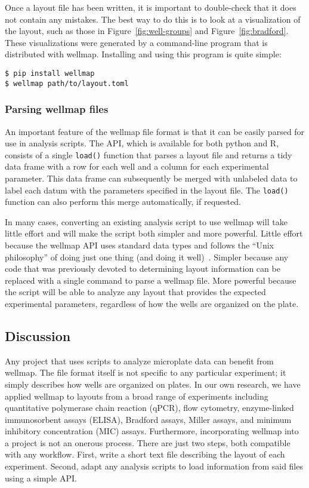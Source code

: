 \documentclass{bmcart}
\begin{document}
Once a layout file has been written, it is important to double-check that it does not contain any mistakes. The best way to do this is to look at a visualization of the layout, such as those in Figure~\ref{fig:well-groups} and Figure~\ref{fig:bradford}. These visualizations were generated by a command-line program that is distributed with wellmap. Installing and using this program is quite simple:

\begin{lstlisting}
$ pip install wellmap
$ wellmap path/to/layout.toml
\end{lstlisting}

\subsubsection*{Parsing wellmap files}

An important feature of the wellmap file format is that it can be easily parsed for use in analysis scripts. The API, which is available for both python and R, consists of a single \texttt{load()} function that parses a layout file and returns a tidy~\cite{wickham2014} data frame with a row for each well and a column for each experimental parameter. This data frame can subsequently be merged with unlabeled data to label each datum with the parameters specified in the layout file. The \texttt{load()} function can also perform this merge automatically, if requested.

In many cases, converting an existing analysis script to use wellmap will take little effort and will make the script both simpler and more powerful. Little effort because the wellmap API uses standard data types and follows the ``Unix philosophy'' of doing just one thing (and doing it well)~\cite{raymond2004}. Simpler because any code that was previously devoted to determining layout information can be replaced with a single command to parse a wellmap file. More powerful because the script will be able to analyze any layout that provides the expected experimental parameters, regardless of how the wells are organized on the plate.

\subsection*{Discussion}

Any project that uses scripts to analyze microplate data can benefit from wellmap. The file format itself is not specific to any particular experiment; it simply describes how wells are organized on plates. In our own research, we have applied wellmap to layouts from a broad range of experiments including quantitative polymerase chain reaction (qPCR), flow cytometry, enzyme-linked immunosorbent assays (ELISA), Bradford assays, Miller assays, and minimum inhibitory concentration (MIC) assays. Furthermore, incorporating wellmap into a project is not an onerous process. There are just two steps, both compatible with any workflow. First, write a short text file describing the layout of each experiment. Second, adapt any analysis scripts to load information from said files using a simple API.
\end{document}
